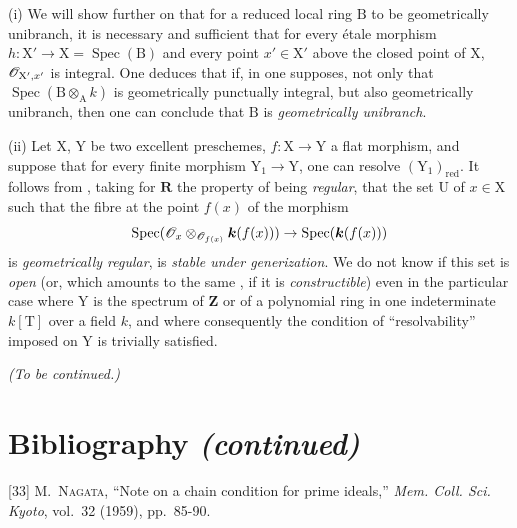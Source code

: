\begin{remarks}[7.9.10]
\label{IV.7.9.10}
(i) We will show further on  that for a reduced local ring $\mathrm{B}$ to be geometrically unibranch, it is necessary and sufficient that for every étale morphism $h:\mathrm{X}'\to\mathrm{X}=\operatorname{Spec}(\mathrm{B})$ and every point $x'\in\mathrm{X}'$ above the closed point of $\mathrm{X}$, $\mathscr{O}_{\mathrm{X}',x'}$ is integral. One deduces that if, in  one supposes, not only that $\operatorname{Spec}(\mathrm{B}\otimes_\mathrm{A} k)$ is geometrically punctually integral, but also geometrically unibranch, then one can conclude that $\mathrm{B}$ is \emph{geometrically unibranch}.


(ii) Let $\mathrm{X}$, $\mathrm{Y}$ be two excellent preschemes, $f:\mathrm{X}\to\mathrm{Y}$ a flat morphism, and suppose that for every finite morphism $\mathrm{Y}_1\to\mathrm{Y}$, one can resolve $(\mathrm{Y}_1)_{\mathrm{red}}$. It follows from , taking for $\boldsymbol{R}$ the property of being \emph{regular}, that the set $\mathrm{U}$ of $x\in\mathrm{X}$ such that the fibre at the point $f(x)$ of the morphism
\[
  \operatorname{Spec}(\mathscr{O}_x\otimes_{\mathscr{O}_{f(x)}}\boldsymbol{k}(f(x)))\to\operatorname{Spec}(\boldsymbol{k}(f(x)))
\]
is \emph{geometrically regular}, is \emph{stable under generization}. We do not know if this set is \emph{open} (or, which amounts to the same , if it is \emph{constructible}) even in the particular case where $\mathrm{Y}$ is the spectrum of $\mathbf{Z}$ or of a polynomial ring in one indeterminate $k[\mathrm{T}]$ over a field $k$, and where consequently the condition of ``resolvability'' imposed on $\mathrm{Y}$ is trivially satisfied.
\end{remarks}

\begin{center}
\emph{(To be continued.)}
\end{center}

\clearpage
{}
{}
\section*{Bibliography \textnormal{\emph{(continued)}}}

\begingroup
\small
\setlength{\parindent}{0pt}
\setlength{\parskip}{4pt}

[33] M.~\textsc{Nagata}, ``Note on a chain condition for prime
ideals,'' \emph{Mem. Coll. Sci. Kyoto}, vol.~32 (1959), pp.~85-90.

